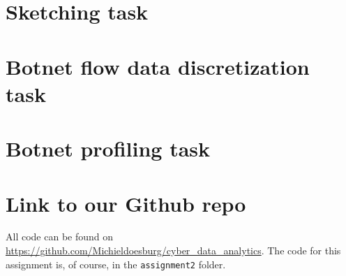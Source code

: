 \documentclass[]{article}
\begin{document}
\section{Sketching task}
\section{Botnet flow data discretization task}
\section{Botnet profiling task}

\section{Link to our Github repo}
All code can be found on \url{https://github.com/Michieldoesburg/cyber_data_analytics}. The code for this assignment is, of course, in the \texttt{assignment2} folder.


\end{document}
